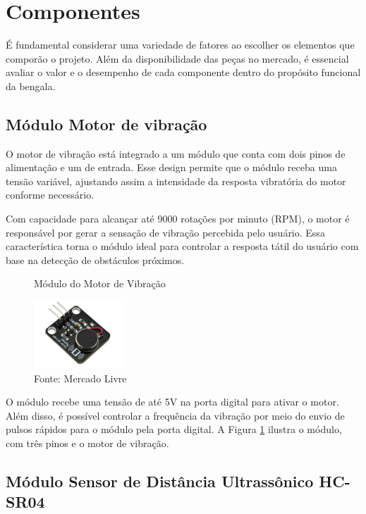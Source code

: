     \section{Componentes}
    É fundamental considerar uma variedade de fatores ao escolher os elementos que comporão o projeto. Além da disponibilidade das peças no mercado, é essencial avaliar o valor e o desempenho de cada componente dentro do propósito funcional da bengala. 

    \subsection{Módulo Motor de vibração}
    O motor de vibração está integrado a um módulo que conta com dois pinos de alimentação e um de entrada. Esse design permite que o módulo receba uma tensão variável, ajustando assim a intensidade da resposta vibratória do motor conforme necessário.

    Com capacidade para alcançar até 9000 rotações por minuto (RPM), o motor é responsável por gerar a sensação de vibração percebida pelo usuário. Essa característica torna o módulo ideal para controlar a resposta tátil do usuário com base na detecção de obstáculos próximos.
    
    
     \begin{figure}[h!]
        \captionsetup{width=1\textwidth}
        \caption{\label{fig:motorvibracao} Módulo do Motor de Vibração}
        \centering
        \includegraphics[width=0.3\textwidth]{figuras/motorvibracao} 
        \caption*{Fonte: Mercado Livre}
    \end{figure}

    O módulo recebe uma tensão de até 5V na porta digital para ativar o motor. Além disso, é possível controlar a frequência da vibração por meio do envio de pulsos rápidos para o módulo pela porta digital. A Figura \ref{fig:motorvibracao} ilustra o módulo, com três pinos e o motor de vibração.

    \subsection{Módulo Sensor de Distância Ultrassônico HC-SR04}

